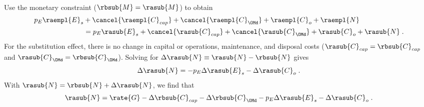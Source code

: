 \begin{landscape}
{}
{
~
  
Use the monetary constraint ($\rbsub{M} = \rasub{M}$) to obtain
%
\begin{align}
  p_E \raempl{E}_s &+ \cancel{\raempl{C}_{cap}} + \cancel{\raempl{C}_{\OMd}} + \raempl{C}_o + \raempl{N} \nonumber \\
                   &= p_E \rasub{E}_s + \cancel{\rasub{C}_{cap}} + \cancel{\rasub{C}_{\OMd}} + \rasub{C}_o + \rasub{N} \; .
\end{align}
%
For the substitution effect, there is no change in capital or operations, maintenance, and disposal costs
($\rasub{C}_{cap} = \rbsub{C}_{cap}$ and $\rasub{C}_{\OMd} = \rbsub{C}_{\OMd}$).
Solving for $\Delta \rasub{N} \equiv \rasub{N} - \rbsub{N}$ gives
%
\begin{equation}
  \Delta \rasub{N} = - p_E \Delta \rasub{E}_s - \Delta \rasub{C}_o \; .
\end{equation}
%
With $\rasub{N} = \rbsub{N} + \Delta \rasub{N}$, 
we find that
%
\begin{equation} \label{eq:N_dot_after_sub}
  \rasub{N} = \rate{G} - \Delta \rbsub{C}_{cap} - \Delta \rbsub{C}_{\OMd} - p_E \Delta \rasub{E}_s - \Delta \rasub{C}_o \; .
\end{equation}
%
}

\end{landscape}
